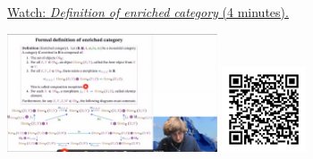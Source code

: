 
\begin{minipage}{10cm}
    \href{https://act4e-spring21.netlify.app/videos/spring2021-enrichment:enrich-cat-def.html}{Watch: \emph{Definition of enriched category} (4 minutes).}
        
    \href{https://act4e-spring21.netlify.app/videos/spring2021-enrichment:enrich-cat-def.html}{\includegraphics[height=3.5cm]{spring2021-enrichment:enrich-cat-def/thumbnails.jpg}}
    \href{https://act4e-spring21.netlify.app/videos/spring2021-enrichment:enrich-cat-def.html}{\includegraphics[height=2.5cm]{spring2021-enrichment:enrich-cat-def/qrcode.png}}
\end{minipage}
